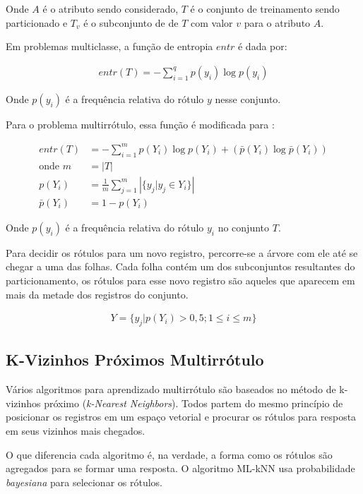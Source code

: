 \documentclass[runningheads,a4paper]{llncs}
\begin{document}
Onde $A$ é o atributo sendo considerado, $T$ é o conjunto de treinamento sendo particionado e $T_v$ é o subconjunto de de $T$ com valor $v$ para o atributo $A$.

Em problemas multiclasse, a função de entropia $entr$ é dada por:

\begin{align*}
	entr(T) = -\sum_{i = 1}^{q} p(y_i) \log p(y_i)
\end{align*}

Onde $p(y_i)$ é a frequência relativa do rótulo $y$ nesse conjunto.

Para o problema multirrótulo, essa função é modificada para \cite{Clare2001-tq}:

\begin{align*}
	entr(T) &= -\sum_{i = 1}^{m} p(Y_i) \log p(Y_i) + (\bar{p}(Y_i) \log \bar{p}(Y_i)) \\
	\text{onde } m &= |T| \\
	p(Y_i) &= \frac{1}{m}\sum_{j = 1}^{m} \left| \{y_j | y_j \in Y_i \} \right| \\
	\bar{p}(Y_i) &= 1 - p(Y_i)
\end{align*}

Onde $p(y_i)$ é a frequência relativa do rótulo $y_i$ no conjunto $T$.

Para decidir os rótulos para um novo registro, percorre-se a árvore com ele até se chegar a uma das folhas. Cada folha contém um dos subconjuntos resultantes do particionamento, os rótulos para esse novo registro são aqueles que aparecem em mais da metade dos registros do conjunto.

\begin{align*}
	Y = \{ y_j | p(Y_i) > 0,5; 1 \leq i \leq m \}
\end{align*}

\subsection{K-Vizinhos Próximos Multirrótulo}\label{sec:todo-k-vizinhos-próximos}

Vários algoritmos para aprendizado multirrótulo são baseados no método de k-vizinhos próximo (\textit{k-Nearest Neighbors}). Todos partem do mesmo princípio de posicionar os registros em um espaço vetorial e procurar os rótulos para resposta em seus vizinhos mais chegados.

O que diferencia cada algoritmo é, na verdade, a forma como os rótulos são agregados para se formar uma resposta. O algoritmo ML-kNN \cite{Zhang2007-id} usa probabilidade \textit{bayesiana} para selecionar os rótulos.
\end{document}
